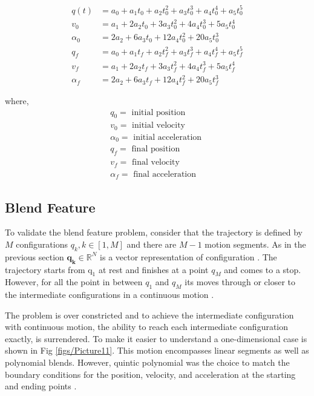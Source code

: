 \documentclass{UoNMCHA}
\numberwithin{equation}{section}
\begin{document}
	
	\begin{align}
	q(t)&=a_{0}+a_{1} t_{0}+a_{2} t_{0}^{2}+a_{3} t_{0}^{3}+a_{4} t_{0}^{4}+a_{5} t_{0}^{5} \\
	v_{0}&=a_{1}+2 a_{2} t_{0}+3 a_{3} t_{0}^{2}+4 a_{4} t_{0}^{3}+5 a_{5} t_{0}^{4} \\
	\alpha_{0}&=2 a_{2}+6 a_{3} t_{0}+12 a_{4} t_{0}^{2}+20 a_{5} t_{0}^{3} \\
	q_{f}&=a_{0}+a_{1} t_{f}+a_{2} t_{f}^{2}+a_{3} t_{f}^{3}+a_{4} t_{f}^{4}+a_{5} t_{f}^{5} \\
	v_{f}&=a_{1}+2 a_{2} t_{f}+3 a_{3} t_{f}^{2}+4 a_{4} t_{f}^{3}+5 a_{5} t_{f}^{4} \\
	\alpha_{f}&=2 a_{2}+6 a_{3} t_{f}+12 a_{4} t_{f}^{2}+20 a_{5} t_{f}^{3}
	\end{align}

	where,
	$$
	\begin{array}{l}
			q_{0}=\text { initial position } \\
		v_{0}=\text { initial velocity } \\
		\alpha_{0}=\text { initial acceleration }\\
	q_{f}=\text { final position } \\
	v_{f}=\text { final velocity } \\
	\alpha_{f}=\text { final acceleration }
	\end{array}
	$$
	\subsection{Blend Feature} 
	
To validate the blend feature problem, consider that the trajectory is defined by $M$ configurations
$q_{k}, k \in[1, M]$ and there are $M-1$ motion segments. As in the previous section $\boldsymbol{q}_{\boldsymbol{k}} \in \mathbb{R}^{N}$ is a vector
representation of configuration \cite{corke_2017_robotics}. The trajectory starts from $\mathrm{q}_{1}$ at rest and finishes at a
point $q_{M}$ and comes to a stop. However, for all the point in between $q_{1}$ and $q_{M}$ its moves through or
closer to the intermediate configurations in a continuous motion \cite{corke_2017_robotics}.
	
The problem is over constricted and to achieve the intermediate configuration with continuous motion,
the ability to reach each intermediate configuration exactly, is surrendered. To make it easier to
understand a one-dimensional case is shown in Fig \ref{figs/Picture11}. This motion encompasses linear segments as
well as polynomial blends. However, quintic polynomial was the choice to match the boundary
conditions for the position, velocity, and acceleration at the starting and ending points \cite{corke_2017_robotics}.
	
\end{document}
